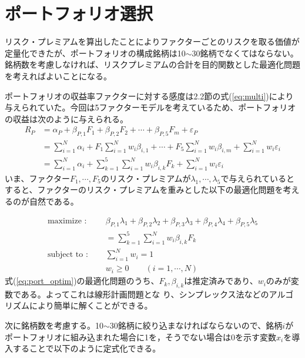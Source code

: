 \documentclass[11pt]{jreport}
\begin{document}
\section{ポートフォリオ選択}
リスク・プレミアムを算出したことによりファクターごとのリスクを取る価値が定量化できたが、ポートフォリオの構成銘柄は10$\sim$30銘柄でなくてはならない。銘柄数を考慮しなければ、リスクプレミアムの合計を目的関数とした最適化問題を考えればよいことになる。

ポートフォリオの収益率ファクターに対する感度は2.2節の式(\ref{eq:multi})により与えられていた。今回は5ファクターモデルを考えているため、ポートフォリオの収益は次のように与えられる。
\begin{equation}
\begin{split}
R_P &= \alpha_P + \beta_{P,1} F_1 + \beta_{P,2} F_2 + \cdots + \beta_{P,5} F_m + \varepsilon_P\\
&=\sum_{i=1}^N \alpha_i + F_1 \sum_{i=1}^N w_i \beta_{i,1} + \cdots + F_5 \sum_{i=1}^N w_i \beta_{i,m} + \sum_{i=1}^N w_i\varepsilon_i\\
&= \sum_{i=1}^N \alpha_i + \sum_{k=1}^5 \sum_{i=1}^N w_i \beta_{i,k} F_k + \sum_{i=1}^N w_i\varepsilon_i
\label{eq:port}
\end{split}
\end{equation}
いま、ファクター$F_1,\cdots,F_5$のリスク・プレミアムが$\lambda_1,\cdots,\lambda_5$で与えられているとすると、ファクターのリスク・プレミアムを重みとした以下の最適化問題を考えるのが自然である。

\begin{equation}
\begin{split}
\text{maximize : }\quad & \beta_{P,1}\lambda_1 + \beta_{P,2}\lambda_2 + \beta_{P,3}\lambda_3 + \beta_{P,4}\lambda_4 + \beta_{P,5}\lambda_5\\
& = \sum_{k=1}^5 \sum_{i=1}^N w_i \beta_{i,k} F_k\\
\text{subject to : }\quad & \sum_{i=1}^N w_i = 1\\
& w_i \geq 0\qquad(i=1,\cdots,N)
\end{split}
\label{eq:port_optim}
\end{equation}
式(\ref{eq:port_optim})の最適化問題のうち、$F_k, \beta_{i,k}$は推定済みであり、$w_i$のみが変数である。よってこれは線形計画問題とな
り、シンプレックス法などのアルゴリズムにより簡単に解くことができる。

次に銘柄数を考慮する。10$\sim$30銘柄に絞り込まなければならないので、銘柄$i$がポートフォリオに組み込まれた場合に1を，そうでない場合は0を示す変数$x_i$を導入することで以下のように定式化できる。
\end{document}
